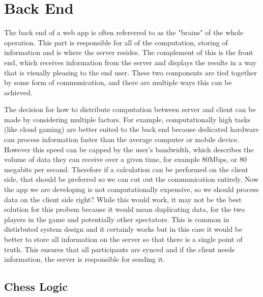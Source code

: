 \section{Back End}

The back end of a web app is often refererred to as the "brains" of the whole operation. This part is responsible for all of the computation, storing of information and is where the server resides. The complement of this is the front end, which receives information from the server and displays the results in a way that is visually pleasing to the end user. These two components are tied together by some form of communication, and there are multiple ways this can be achieved.


The decision for how to distribute computation between server and client can be made by considering multiple factors. For example, computationally high tasks (like cloud gaming) are better suited to the back end because dedicated hardware can process information faster than the average computer or mobile device. However this speed can be capped by the user's bandwidth, which describes the volume of data they can receive over a given time, for example 80Mbps, or 80 megabits per second. Therefore if a calculation can be performed on the client side, that should be preferred so we can cut out the communication entirely. Now the app we are developing is not computationally expensive, so we should process data on the client side right? While this would work, it may not be the best solution for this probem because it would mean duplicating data, for the two players in the game and potentially other spectators. This is common in distirbuted system design and it certainly works but in this case it would be better to store all information on the server so that there is a single point of truth. This ensures that all participants are synced and if the client needs information, the server is responsible for sending it.

\subsection{Chess Logic}


